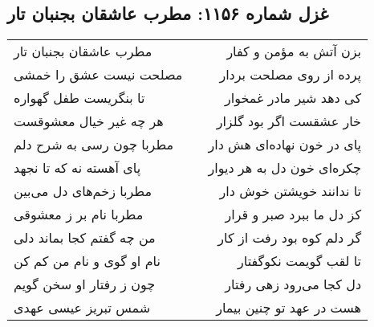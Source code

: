 \begin{center}
\section*{غزل شماره ۱۱۵۶: مطرب عاشقان بجنبان تار}
\label{sec:1156}
\begin{longtable}{l p{0.5cm} r}
مطرب عاشقان بجنبان تار
&&
بزن آتش به مؤمن و کفار
\\
مصلحت نیست عشق را خمشی
&&
پرده از روی مصلحت بردار
\\
تا بنگریست طفل گهواره
&&
کی دهد شیر مادر غمخوار
\\
هر چه غیر خیال معشوقست
&&
خار عشقست اگر بود گلزار
\\
مطربا چون رسی به شرح دلم
&&
پای در خون نهاده‌ای هش دار
\\
پای آهسته نه که تا نجهد
&&
چکره‌ای خون دل به هر دیوار
\\
مطربا زخم‌های دل می‌بین
&&
تا ندانند خویشتن خوش دار
\\
مطربا نام بر ز معشوقی
&&
کز دل ما ببرد صبر و قرار
\\
من چه گفتم کجا بماند دلی
&&
گر دلم کوه بود رفت از کار
\\
نام او گوی و نام من کم کن
&&
تا لقب گویمت نکوگفتار
\\
چون ز رفتار او سخن گویم
&&
دل کجا می‌رود زهی رفتار
\\
شمس تبریز عیسی عهدی
&&
هست در عهد تو چنین بیمار
\\
\end{longtable}
\end{center}
